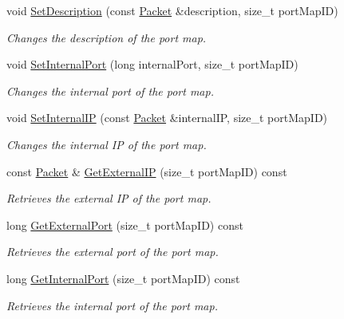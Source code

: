 \begin{DoxyCompactItemize}
void \hyperlink{class_upnp_nat_communication_ab0b8e06057012b926db33dca8b8c27b7}{SetDescription} (const \hyperlink{class_packet}{Packet} \&description, size\_\-t portMapID)
\begin{DoxyCompactList}\small\item\em Changes the description of the port map. \item\end{DoxyCompactList}\item 
void \hyperlink{class_upnp_nat_communication_a2ad4233d0fb79b78187c9fe1c8f82255}{SetInternalPort} (long internalPort, size\_\-t portMapID)
\begin{DoxyCompactList}\small\item\em Changes the internal port of the port map. \item\end{DoxyCompactList}\item 
void \hyperlink{class_upnp_nat_communication_a6f838066fccb2c3c873c4ee4830e8cc6}{SetInternalIP} (const \hyperlink{class_packet}{Packet} \&internalIP, size\_\-t portMapID)
\begin{DoxyCompactList}\small\item\em Changes the internal IP of the port map. \item\end{DoxyCompactList}\item 
const \hyperlink{class_packet}{Packet} \& \hyperlink{class_upnp_nat_communication_a5ca48f022215446e7133cfa094b6b606}{GetExternalIP} (size\_\-t portMapID) const 
\begin{DoxyCompactList}\small\item\em Retrieves the external IP of the port map. \item\end{DoxyCompactList}\item 
long \hyperlink{class_upnp_nat_communication_a6eb160e6207de28c3117bcdfb4177df2}{GetExternalPort} (size\_\-t portMapID) const 
\begin{DoxyCompactList}\small\item\em Retrieves the external port of the port map. \item\end{DoxyCompactList}\item 
long \hyperlink{class_upnp_nat_communication_a52f93e997bbb9ba0ad86dcf1ec813394}{GetInternalPort} (size\_\-t portMapID) const 
\begin{DoxyCompactList}\small\item\em Retrieves the internal port of the port map. \item\end{DoxyCompactList}\item 

\end{DoxyCompactItemize}
